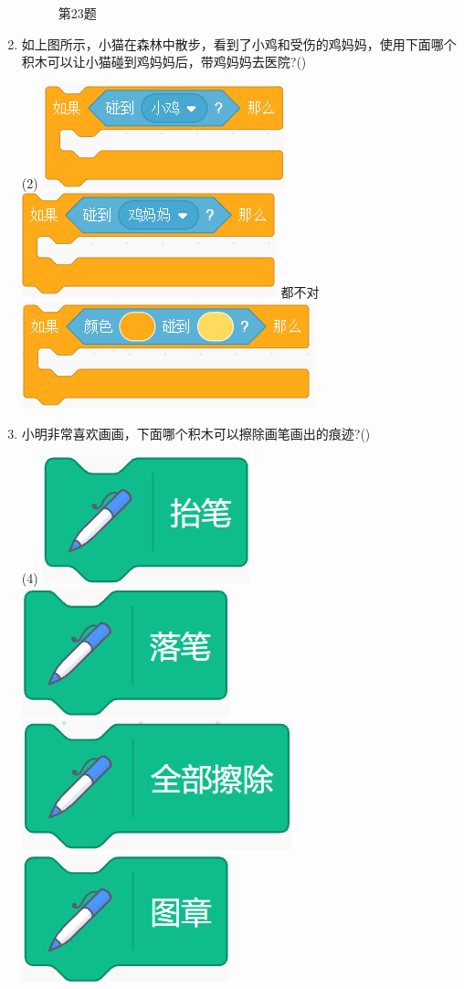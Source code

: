 \documentclass[10pt, a4paper]{article}
\begin{document}
\begin{enumerate}
\begin{figure}[htbp]
\begin{minipage}[t]{.14\textwidth}
                \caption*{第23题}
            \end{minipage}
        \end{figure}

        \item  如上图所示，小猫在森林中散步，看到了小鸡和受伤的鸡妈妈，使用下面哪个积木可以让小猫碰到鸡妈妈后，带鸡妈妈去医院?(\qquad)
        \begin{tasks}(2)
            \task \includegraphics[width=.18\textwidth]{20a.png}
            \task \includegraphics[width=.18\textwidth]{20b.png}
            \task 都不对
            \task \includegraphics[width=.18\textwidth]{20d.png}
        \end{tasks}

        \item 小明非常喜欢画画，下面哪个积木可以擦除画笔画出的痕迹?(\qquad)
        \begin{tasks}(4)
            \task \includegraphics[width=.1\textwidth]{21a.png}
            \task \includegraphics[width=.1\textwidth]{21b.png}
            \task \includegraphics[width=.13\textwidth]{21c.png}
            \task \includegraphics[width=.1\textwidth]{21d.png}
        \end{tasks}


\end{enumerate}
\end{document}
